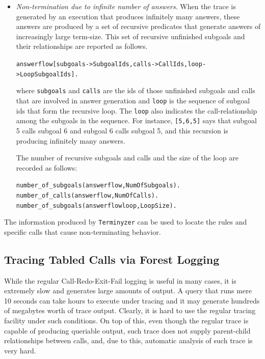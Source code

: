 \documentclass[11pt]{article}
\begin{document}
{\begin{itemize}
\item \emph{Non-termination due to infinite number of answers}. 
  When the trace is generated by an execution that produces
  infinitely many answers, these answers are produced by a set of
  recursive predicates that generate answers of increasingly large
  term-size.
  This set of recursive unfinished subgoals and their relationships
  are reported as follows. 
\begin{alltt}
   answerflow[subgoals->SubgoalIds,calls->CallIds,loop->LoopSubgoalIds].
\end{alltt}
  where {\tt subgoals} and {\tt calls} are the ids of those unfinished
  subgoals and calls that are involved in answer generation 
  and {\tt loop} is the sequence of subgoal ids that form the
  recursive loop. 
  The {\tt loop} also indicates the call-relationship among the subgoals in
  the sequence. 
  For instance, {\tt [5,6,5]} says
  that subgoal 5 calls subgoal 6 and subgoal 6 calls subgoal 5, and
  this recursion is producing infinitely many answers. 

  The number of recursive subgoals and calls and the size of the loop
  are recorded as follows:
\begin{alltt}
   number\_of\_subgoals(answerflow,NumOfSubgoals).\\
   number\_of\_calls(answerflow,NumOfCalls).\\
   number\_of\_subgoals(answerflowloop,LoopSize).
\end{alltt}
\end{itemize}
The information produced by {\tt Terminyzer} can be used to locate
the rules and specific calls that cause
non-terminating behavior.

} %





\subsection{Tracing Tabled Calls via Forest Logging}\label{sec-logforest}

While the regular Call-Redo-Exit-Fail logging is useful in many cases, it
is extremely slow and generates large amounts of output. A query that
runs mere 10 seconds can take hours to execute under tracing and it may
generate hundreds of megabytes worth of trace output. Clearly, it is hard
to use the regular tracing facility under such conditions.
On top of this, even though the regular trace is capable of producing
queriable output, such trace does not supply parent-child 
relationships between calls, and, due to this, automatic analysis of
such trace is very hard.
\end{document}
